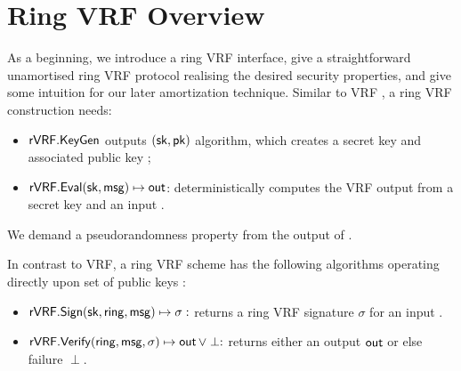 \section{Ring VRF Overview}
\label{sec:overview}

As a beginning, we introduce a ring VRF interface, give a straightforward unamortised
 ring VRF protocol realising the desired security properties,
and give some intuition for our later amortization technique.
Similar to VRF \cite{vrf_micali}, a ring VRF construction needs: 

\begin{itemize}
\item ${\mathsf{rVRF}}.{\mathsf{KeyGen}} $ outputs $ (\mathsf{sk}, \mathsf{pk})$ algorithm,
 which creates a secret key \sk and associated public key \pk;

\item ${\mathsf{rVRF}}.{\mathsf{Eval}}(\mathsf{sk},\mathsf{msg}) \mapsto {\ensuremath{\mathsf{out}}}$:  deterministically computes the VRF output \Out from a secret key \sk and an input \msg.
\end{itemize}
%


We demand a pseudorandomness property from the output of \Eval. 


In contrast to VRF, a ring VRF scheme has the following algorithms operating directly upon
 set of public keys \ring:
\begin{itemize}
\item ${\mathsf{rVRF}}.{\mathsf{Sign}}(\mathsf{sk},\mathsf{ring},\mathsf{msg}) \mapsto \sigma:$
    returns a ring VRF signature $\sigma$ for an input \msg.
\item ${\mathsf{rVRF}}.{\mathsf{Verify}}(\mathsf{ring},\mathsf{msg},\sigma) \mapsto {\ensuremath{\mathsf{out}}} \, \lor \perp:$
    returns either an output ${\mathsf{out}}$ or else failure $\perp$.
\end{itemize}


